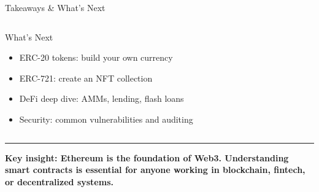 \documentclass[8pt,aspectratio=169]{beamer}
\newcommand{\bottomnote}[1]{%
\vfill
\vspace{-2mm}
\textcolor{mllavender2}{\rule{\textwidth}{0.4pt}}
\vspace{1mm}
\footnotesize
\textbf{#1}
}
\begin{document}
\begin{frame}{Takeaways \& What's Next}
\begin{columns}[T]
\vspace{1mm}
\begin{block}{\small What's Next}
\begin{itemize}\scriptsize
    \item ERC-20 tokens: build your own currency
    \item ERC-721: create an NFT collection
    \item DeFi deep dive: AMMs, lending, flash loans
    \item Security: common vulnerabilities and auditing
\end{itemize}
\end{block}
\end{columns}

\vspace{2mm}
\begin{center}
\end{center}

\bottomnote{Key insight: Ethereum is the foundation of Web3. Understanding smart contracts is essential for anyone working in blockchain, fintech, or decentralized systems.}
\end{frame}
\end{document}
